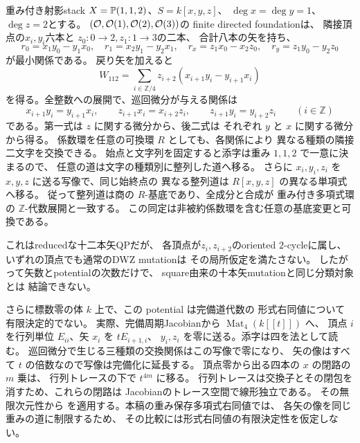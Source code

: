 \begin{example}[任意の十二本矢を同一視できない例]
\label{ex:qa-as12-weighted-stack}
重み付き射影stack
$X=\mathbb P(1,1,2)$、$S=k[x,y,z]$、
$\deg x=\deg y=1$、$\deg z=2$とする。
$(\mathcal O,\mathcal O(1),\mathcal O(2),\mathcal O(3))$の
finite directed foundationは、
隣接頂点の$x_i,y_i$六本と
$z_0:0\to2,z_1:1\to3$の二本、
合計八本の矢を持ち、
\[
r_0=x_1y_0-y_1x_0,\quad
r_1=x_2y_1-y_2x_1,\quad
r_x=z_1x_0-x_2z_0,\quad
r_y=z_1y_0-y_2z_0
\]
が最小関係である。
戻り矢を加えると
\begin{equation}
 W_{112}=\sum_{i\in\mathbb Z/4}
 z_{i+2}(x_{i+1}y_i-y_{i+1}x_i)
 \label{eq:qa-as12-weighted-qp}
\end{equation}
を得る。全整数への展開で、巡回微分が与える関係は
\[
 x_{i+1}y_i=y_{i+1}x_i,\qquad
 z_{i+1}x_i=x_{i+2}z_i,\qquad
 z_{i+1}y_i=y_{i+2}z_i\qquad(i\in\mathbb Z)
\]
である。第一式は $z$ に関する微分から、後二式は
それぞれ $y$ と $x$ に関する微分から得る。
係数環を任意の可換環 $R$ としても、各関係により
異なる種類の隣接二文字を交換できる。
始点と文字列を固定すると添字は重み $1,1,2$ で一意に決まるので、
任意の道は文字の種類別に整列した道へ移る。
さらに $x_i,y_i,z_i$ を $x,y,z$ に送る写像で、同じ始終点の
異なる整列道は $R[x,y,z]$ の異なる単項式へ移る。
従って整列道は商の $R$-基底であり、全成分と合成が
重み付き多項式環の $\mathbb Z$-代数展開と一致する。
この同定は非被約係数環を含む任意の基底変更と可換である。

これはreducedな十二本矢QPだが、
各頂点が$z_i,z_{i+2}$のoriented $2$-cycleに属し、
いずれの頂点でも通常のDWZ mutationは
その局所仮定を満たさない。
したがって矢数とpotentialの次数だけで、
square由来の十本矢mutationと同じ分類対象とは
結論できない。

さらに標数零の体 $k$ 上で、この potential は完備道代数の
形式右同値について有限決定的でない。
実際、完備周期Jacobianから $\operatorname{Mat}_4(k[[t]])$ へ、
頂点 $i$ を行列単位 $E_{ii}$、矢 $x_i$ を $tE_{i+1,i}$、
$y_i,z_i$ を零に送る。添字は四を法として読む。
巡回微分で生じる三種類の交換関係はこの写像で零になり、
矢の像はすべて $t$ の倍数なので写像は完備化に延長する。
頂点零から出る四本の $x$ の閉路の $m$ 乗は、
行列トレースの下で $t^{4m}$ に移る。
行列トレースは交換子とその閉包を消すため、これらの閉路は
Jacobianのトレース空間で線形独立である。
その無限次元性から \cite[Theorem 4.8]{HuaZhou2026Determinacy}
を適用する。本稿の重み保存多項式右同値では、
各矢の像を同じ重みの道に制限するため、
その比較には形式右同値の有限決定性を仮定しない。
\end{example}

